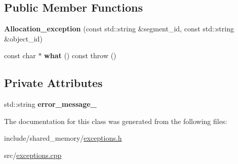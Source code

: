 \subsection*{Public Member Functions}
\begin{DoxyCompactItemize}
\item 
{\bfseries Allocation\+\_\+exception} (const std\+::string \&segment\+\_\+id, const std\+::string \&object\+\_\+id)\hypertarget{classshared__memory_1_1Allocation__exception_ac81ff8567ac6c6cec754fefc5fe79d12}{}\label{classshared__memory_1_1Allocation__exception_ac81ff8567ac6c6cec754fefc5fe79d12}

\item 
const char $\ast$ {\bfseries what} () const   throw ()\hypertarget{classshared__memory_1_1Allocation__exception_ac0764146f0a70b242491a990fa448dc3}{}\label{classshared__memory_1_1Allocation__exception_ac0764146f0a70b242491a990fa448dc3}

\end{DoxyCompactItemize}
\subsection*{Private Attributes}
\begin{DoxyCompactItemize}
\item 
std\+::string {\bfseries error\+\_\+message\+\_\+}\hypertarget{classshared__memory_1_1Allocation__exception_a57a0e22bd60d77310cd67371a2294028}{}\label{classshared__memory_1_1Allocation__exception_a57a0e22bd60d77310cd67371a2294028}

\end{DoxyCompactItemize}


The documentation for this class was generated from the following files\+:\begin{DoxyCompactItemize}
\item 
include/shared\+\_\+memory/\hyperlink{exceptions_8h}{exceptions.\+h}\item 
src/\hyperlink{exceptions_8cpp}{exceptions.\+cpp}\end{DoxyCompactItemize}
